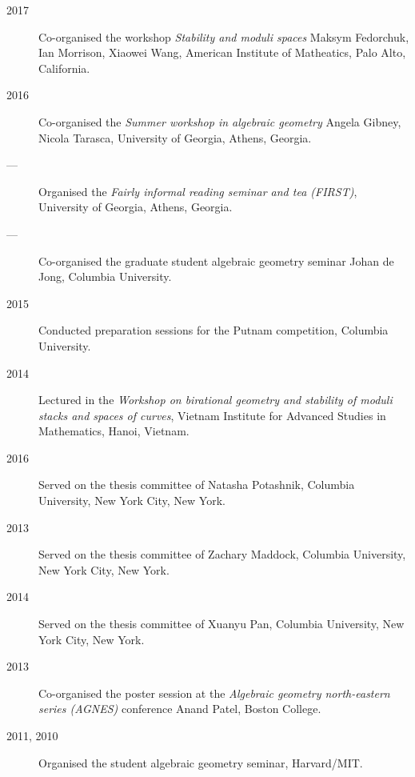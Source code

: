 \documentclass[11pt]{article}
\begin{document}
\begin{description}
\item[{2017}] Co-organised the workshop \emph{Stability and moduli spaces} Maksym Fedorchuk, Ian Morrison, Xiaowei Wang, American Institute of Matheatics, Palo Alto, California.
\item[{2016}] Co-organised the \emph{Summer workshop in algebraic geometry} Angela Gibney, Nicola Tarasca, University of Georgia, Athens, Georgia.
\item[{---}] Organised the \emph{Fairly informal reading seminar and tea (FIRST)}, University of Georgia, Athens, Georgia.
\item[{---}] Co-organised the graduate student algebraic geometry seminar Johan de Jong, Columbia University.
\item[{2015}] Conducted preparation sessions for the Putnam competition, Columbia University.
\item[{2014}] Lectured in the \emph{Workshop on birational geometry and stability of moduli stacks and spaces of curves}, Vietnam Institute for Advanced Studies in Mathematics, Hanoi, Vietnam.
\item[{2016}] Served on the thesis committee of Natasha Potashnik, Columbia University, New York City, New York.
\item[{2013}] Served on the thesis committee of Zachary Maddock, Columbia University, New York City, New York.
\item[{2014}] Served on the thesis committee of Xuanyu Pan, Columbia University, New York City, New York.
\item[{2013}] Co-organised the poster session at the \emph{Algebraic geometry north-eastern series (AGNES)} conference Anand Patel, Boston College.
\item[{2011, 2010}] Organised the student algebraic geometry seminar, Harvard/MIT.
\end{description}
\end{document}
